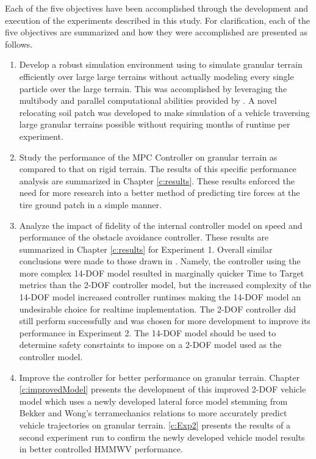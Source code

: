 \documentclass[12pt,onecolumn]{report}
\newcommand{\CHRONO}{{\sffamily{{Chrono}}}}
\begin{document}
Each of the five objectives have been accomplished through the development and execution of the experiments described in this study. For clarification, each of the five objectives are summarized and how they were accomplished are presented as follows.

\begin{enumerate}
\item
Develop a robust simulation environment using {\CHRONO} to simulate granular terrain efficiently over large large terrains without actually modeling every single particle over the large terrain. This was accomplished by leveraging the multibody and parallel computational abilities provided by {\CHRONO}. A novel relocating soil patch was developed to make simulation of a vehicle traversing large granular terrains possible without requiring months of runtime per experiment. 
\item
Study the performance of the MPC Controller on granular terrain as compared to that on rigid terrain. The results of this specific performance analysis are summarized in Chapter \ref{c:results}. These results enforced the need for more research into a better method of predicting tire forces at the tire ground patch in a simple manner. 
\item
Analyze the impact of fidelity of the internal controller model on speed and performance of the obstacle avoidance controller. These results are summarized in Chapter \ref{c:results} for Experiment 1. Overall similar conclusions were made to those drawn in \cite{ModelFidelity2016}. Namely, the controller using the more complex 14-DOF model resulted in marginally quicker Time to Target metrics than the 2-DOF controller model, but the increased complexity of the 14-DOF model increased controller runtimes making the 14-DOF model an undesirable choice for realtime implementation. The 2-DOF controller did still perform successfully and was chosen for more development to  improve its performance in Experiment 2. The 14-DOF model should be used to determine safety consrtaints to impose on a 2-DOF model used as the controller model. 
\item
Improve the controller for better performance on granular terrain. Chapter \ref{c:improvedModel} presents the development of this improved 2-DOF vehicle model which uses a newly developed lateral force model stemming from Bekker and Wong's terramechanics relations to more accurately predict vehicle trajectories on granular terrain. \ref{c:Exp2} presents the results of a second experiment run to confirm the newly developed vehicle model results in better controlled HMMWV performance.  

\end{enumerate}
\end{document}
